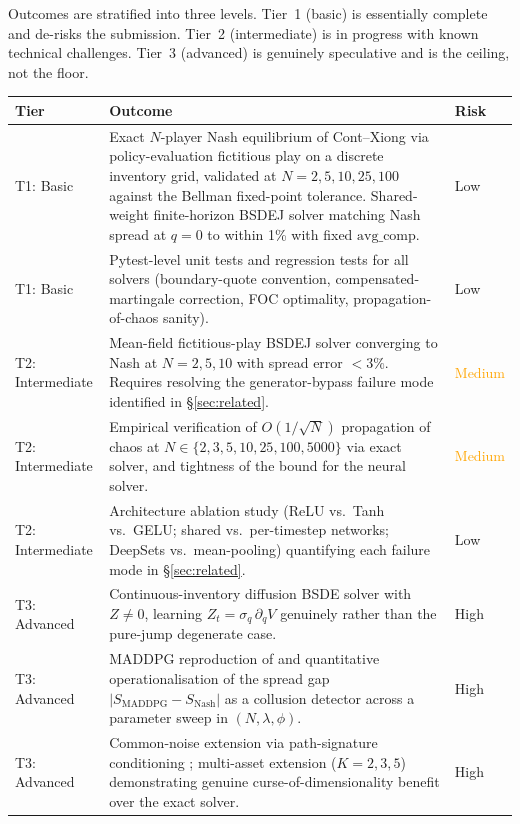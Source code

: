\documentclass[11pt,a4paper]{article}
\begin{document}
Outcomes are stratified into three levels.  Tier~1 (basic) is
essentially complete and de-risks the submission.  Tier~2
(intermediate) is in progress with known technical challenges.
Tier~3 (advanced) is genuinely speculative and is the ceiling,
not the floor.

\begin{table}[h!]
\centering
\small
\begin{tabular}{>{\raggedright\arraybackslash}p{}
                >{\raggedright\arraybackslash}p{}
                >{\centering\arraybackslash}p{}}
\toprule
\textbf{Tier} & \textbf{Outcome} & \textbf{Risk} \\
\midrule
T1: Basic
  & Exact $N$-player Nash equilibrium of Cont--Xiong via policy-evaluation
    fictitious play on a discrete inventory grid, validated at
    $N = 2, 5, 10, 25, 100$ against the Bellman fixed-point tolerance.
    Shared-weight finite-horizon BSDEJ solver matching Nash spread at $q=0$
    to within 1\% with fixed $\mathrm{avg\_comp}$.
  & \textcolor{green!50!black}{Low} \\[2pt]
T1: Basic
  & Pytest-level unit tests and regression tests for all solvers
    (boundary-quote convention, compensated-martingale correction,
    FOC optimality, propagation-of-chaos sanity).
  & \textcolor{green!50!black}{Low} \\[2pt]
\midrule
T2: Intermediate
  & Mean-field fictitious-play BSDEJ solver converging to Nash at
    $N = 2, 5, 10$ with spread error $< 3\%$.  Requires resolving the
    generator-bypass failure mode identified in \S\ref{sec:related}.
  & \textcolor{orange}{Medium} \\[2pt]
T2: Intermediate
  & Empirical verification of $O(1/\sqrt{N})$ propagation of chaos
    \citep{buckdahn2009limit} at $N \in \{2, 3, 5, 10, 25, 100, 5000\}$
    via exact solver, and tightness of the bound for the neural solver.
  & \textcolor{orange}{Medium} \\[2pt]
T2: Intermediate
  & Architecture ablation study (ReLU vs.\ Tanh vs.\ GELU; shared vs.\
    per-timestep networks; DeepSets vs.\ mean-pooling) quantifying each
    failure mode in \S\ref{sec:related}.
  & \textcolor{green!50!black}{Low} \\[2pt]
\midrule
T3: Advanced
  & Continuous-inventory diffusion BSDE solver with $Z \neq 0$,
    learning $Z_t = \sigma_q\,\partial_q V$ genuinely rather than the
    pure-jump degenerate case.
  & \textcolor{red!70!black}{High} \\[2pt]
T3: Advanced
  & MADDPG reproduction of \citet{cont2024} and quantitative
    operationalisation of the spread gap
    $|S_{\mathrm{MADDPG}} - S_{\mathrm{Nash}}|$ as a collusion
    detector across a parameter sweep in $(N, \lambda, \phi)$.
  & \textcolor{red!70!black}{High} \\[2pt]
T3: Advanced
  & Common-noise extension via path-signature conditioning
    \citep{hu2025}; multi-asset extension ($K = 2, 3, 5$) demonstrating
    genuine curse-of-dimensionality benefit over the exact solver.
  & \textcolor{red!70!black}{High} \\
\bottomrule
\end{tabular}
\end{table}
\end{document}
